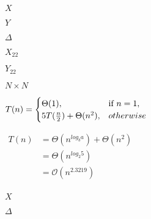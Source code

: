 \documentclass[10pt]{book}
\begin{document}
\begin{mdSnippets}
\begin{mdInlineSnippet}[02129bb861061d1a052c592e2dc6b383]%
$X$\end{mdInlineSnippet}%
\begin{mdInlineSnippet}[57cec4137b614c87cb4e24a3d003a3e0]%
$Y$\end{mdInlineSnippet}%
\begin{mdInlineSnippet}[967878d1da852d4b07a961e3168b0fff]%
$\Delta$\end{mdInlineSnippet}%
\begin{mdInlineSnippet}[6251022e6652340cba75729f50fe6b30]%
$X_{22}$\end{mdInlineSnippet}%
\begin{mdInlineSnippet}[3165313348ba27e1079960bff02d2249]%
$Y_{22}$\end{mdInlineSnippet}%
\begin{mdInlineSnippet}[cd94a3641bb6ba72c90dd0d8f4d2e199]%
$N \times N$\end{mdInlineSnippet}%
\begin{mdInlineSnippet}%
$\begin{aligned}T(n) &= \begin{cases}\Theta(1),  & \text{if } n = 1,\\5T({n \over 2}) + \Theta(n^{2}), & otherwise\end{cases}\end{aligned}$\end{mdInlineSnippet}%
\begin{mdInlineSnippet}[865735bd90c5811b51bb546541a03ea2]%
$\begin{aligned}T(n) &= \Theta(n^{log_{b} a}) + \Theta(n^{2})\\   &= \Theta(n^{log_{2} 5})\\ &= \mathcal{O}{(n^{2.3219})}\\\end{aligned} $\end{mdInlineSnippet}%
\begin{mdInlineSnippet}[02129bb861061d1a052c592e2dc6b383]%
$X$\end{mdInlineSnippet}%
\begin{mdInlineSnippet}[967878d1da852d4b07a961e3168b0fff]%
$\Delta$\end{mdInlineSnippet}%

\end{mdSnippets}
\end{document}

